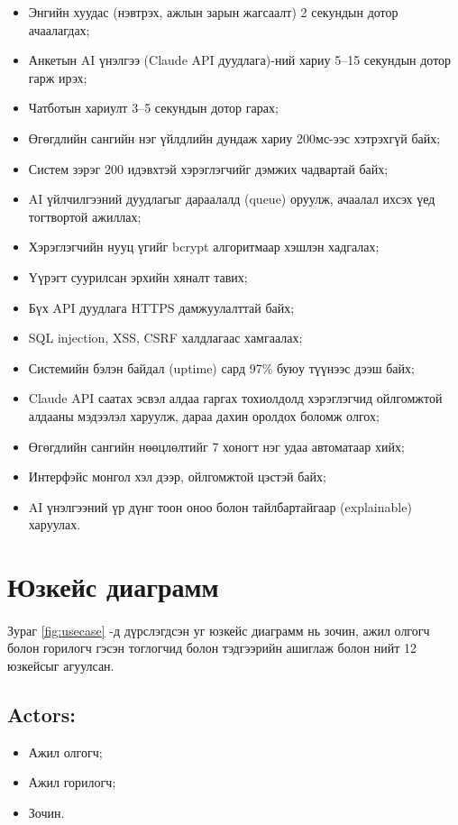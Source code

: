 \begin{itemize}
    \item Энгийн хуудас (нэвтрэх, ажлын зарын жагсаалт) 2 секундын дотор ачаалагдах;
    \item Анкетын AI үнэлгээ (Claude API дуудлага)-ний хариу 5--15 секундын дотор гарж ирэх;
    \item Чатботын хариулт 3--5 секундын дотор гарах;
    \item Өгөгдлийн сангийн нэг үйлдлийн дундаж хариу 200мс-ээс хэтрэхгүй байх;
    \item Систем зэрэг 200 идэвхтэй хэрэглэгчийг дэмжих чадвартай байх;
    \item AI үйлчилгээний дуудлагыг дараалалд (queue) оруулж, ачаалал ихсэх үед тогтвортой ажиллах;
    \item Хэрэглэгчийн нууц үгийг bcrypt алгоритмаар хэшлэн хадгалах;
    \item Үүрэгт суурилсан эрхийн хяналт тавих;
    \item Бүх API дуудлага HTTPS дамжуулалттай байх;
    \item SQL injection, XSS, CSRF халдлагаас хамгаалах;
    \item Системийн бэлэн байдал (uptime) сард 97\% буюу түүнээс дээш байх;
    \item Claude API саатах эсвэл алдаа гаргах тохиолдолд хэрэглэгчид ойлгомжтой алдааны мэдээлэл харуулж, дараа дахин оролдох боломж олгох;
    \item Өгөгдлийн сангийн нөөцлөлтийг 7 хоногт нэг удаа автоматаар хийх;
    \item Интерфэйс монгол хэл дээр, ойлгомжтой цэстэй байх;
    \item AI үнэлгээний үр дүнг тоон оноо болон тайлбартайгаар (explainable) харуулах.
\end{itemize}
\section{Юзкейс диаграмм}
\paragraph{} Зураг \ref{fig:usecase} -д дүрслэгдсэн уг юзкейс диаграмм нь зочин, ажил олгогч болон горилогч гэсэн тоглогчид болон тэдгээрийн ашиглаж болон нийт 12 юзкейсыг агуулсан.
\subsection* {\textbf{Actors:}}
    \begin{itemize}
        \item Ажил олгогч;
        \item Ажил горилогч;
        \item Зочин.
    \end{itemize} 
